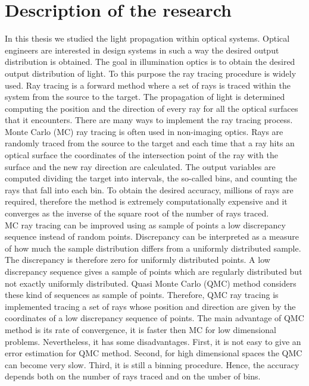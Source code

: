\chapter*{Description of the research}
In this thesis we studied the light propagation within optical systems.
Optical engineers are interested in design systems in such a way the desired output distribution is obtained.
The goal in illumination optics is to obtain the desired output distribution of light. To this purpose the ray tracing procedure is widely used. Ray tracing is a forward method where a set of rays is traced within the system from the source to the target. The propagation of light is determined computing the position and the direction of every ray for all the optical surfaces that it encounters. There are many ways to implement the ray tracing process. Monte Carlo (MC) ray tracing is often used in non-imaging optics. Rays are randomly traced from the source to the target and each time that a ray hits an optical surface the coordinates of the intersection point of the ray with the surface and the new ray direction are calculated. The output variables are computed dividing the target into intervals, the so-called bins, and counting the rays that fall into each bin. To obtain the desired accuracy, millions of rays are required, therefore the method is extremely computationally expensive and it converges as the inverse of the square root of the number of rays traced. 
\\ \indent 
MC ray tracing can be improved using as sample of points a low discrepancy sequence instead of random points. Discrepancy can be interpreted as a measure of how much the sample distribution differs from a uniformly distributed sample. The discrepancy is therefore zero for uniformly distributed points. A low discrepancy sequence gives a sample of points which are regularly distributed but not exactly uniformly distributed. Quasi Monte Carlo (QMC) method considers these kind of sequences as sample of points. Therefore, QMC ray tracing is implemented tracing a set of rays whose position and direction are given by the coordinates of a low discrepancy sequence of points.
The main advantage of QMC method is its rate of convergence, it is faster then MC for low dimensional problems. Nevertheless, it has some disadvantages. First, it is not easy to give an error estimation for QMC method. Second, for high dimensional spaces the QMC can become very slow. Third, it is still a binning procedure. Hence, the accuracy depends both on the number of rays traced and on the umber of bins.
